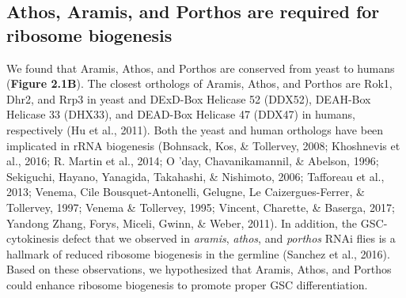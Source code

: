 \documentclass[12pt,oneside]{reedthesis}
\begin{document}
\setlength\parindent{24pt}

\textbf{\hfill\break
}

\hypertarget{athos-aramis-and-porthos-are-required-for-ribosome-biogenesis}{%
\subsection{Athos, Aramis, and Porthos are required for ribosome biogenesis}\label{athos-aramis-and-porthos-are-required-for-ribosome-biogenesis}}

We found that Aramis, Athos, and Porthos are conserved from yeast to humans (\textbf{Figure 2.1B}). The closest orthologs of Aramis, Athos, and Porthos are Rok1, Dhr2, and Rrp3 in yeast and DExD-Box Helicase 52 (DDX52), DEAH-Box Helicase 33 (DHX33), and DEAD-Box Helicase 47 (DDX47) in humans, respectively (Hu et al., 2011). Both the yeast and human orthologs have been implicated in rRNA biogenesis (Bohnsack, Kos, \& Tollervey, 2008; Khoshnevis et al., 2016; R. Martin et al., 2014; O 'day, Chavanikamannil, \& Abelson, 1996; Sekiguchi, Hayano, Yanagida, Takahashi, \& Nishimoto, 2006; Tafforeau et al., 2013; Venema, Cile Bousquet-Antonelli, Gelugne, Le Caizergues-Ferrer, \& Tollervey, 1997; Venema \& Tollervey, 1995; Vincent, Charette, \& Baserga, 2017; Yandong Zhang, Forys, Miceli, Gwinn, \& Weber, 2011). In addition, the GSC-cytokinesis defect that we observed in \emph{aramis}, \emph{athos}, and \emph{porthos} RNAi flies is a hallmark of reduced ribosome biogenesis in the germline (Sanchez et al., 2016). Based on these observations, we hypothesized that Aramis, Athos, and Porthos could enhance ribosome biogenesis to promote proper GSC differentiation.
\end{document}

